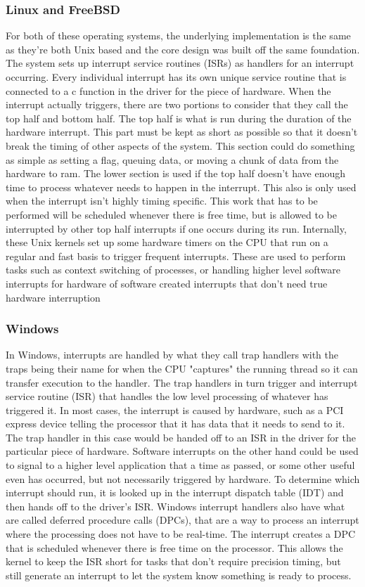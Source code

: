 \subsubsection{Linux and FreeBSD}
For both of these operating systems, the underlying implementation is the same as they're both Unix based and the core design was built off the same foundation. The system sets up interrupt service routines (ISRs) as handlers for an interrupt occurring. Every individual interrupt has its own unique service routine that is connected to a c function in the driver for the piece of hardware. When the interrupt actually triggers, there are two portions to consider that they call the top half and bottom half. The top half is what is run during the duration of the hardware interrupt. This part must be kept as short as possible so that it doesn't break the timing of other aspects of the system. This section could do something as simple as setting a flag, queuing data, or moving a chunk of data from the hardware to ram. The lower section is used if the top half doesn't have enough time to process whatever needs to happen in the interrupt. This also is only used when the interrupt isn't highly timing specific. This work that has to be performed will be scheduled whenever there is free time, but is allowed to be interrupted by other top half interrupts if one occurs during its run. Internally, these Unix kernels set up some hardware timers on the CPU that run on a regular and fast basis to trigger frequent interrupts. These are used to perform tasks such as context switching of processes, or handling higher level software interrupts for hardware of software created interrupts that don't need true hardware interruption

\subsubsection{Windows}
In Windows, interrupts are handled by what they call trap handlers with the traps being their name for when the CPU "captures" the running thread so it can transfer execution to the handler. The trap handlers in turn trigger and interrupt service routine (ISR) that handles the low level processing of whatever has triggered it. In most cases, the interrupt is caused by hardware, such as a PCI express device telling the processor that it has data that it needs to send to it. The trap handler in this case would be handed off to an ISR in the driver for the particular piece of hardware. Software interrupts on the other hand could be used to signal to a higher level application that a time as passed, or some other useful even has occurred, but not necessarily triggered by hardware. To determine which interrupt should run, it is looked up in the interrupt dispatch table (IDT) and then hands off to the driver's ISR. Windows interrupt handlers also have what are called deferred procedure calls (DPCs), that are a way to process an interrupt where the processing does not have to be real-time. The interrupt creates a DPC that is scheduled whenever there is free time on the processor. This allows the kernel to keep the ISR short for tasks that don't require precision timing, but still generate an interrupt to let the system know something is ready to process.

